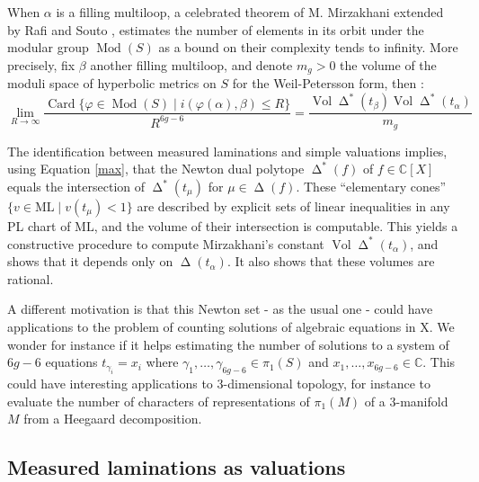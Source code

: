 \documentclass{amsart}
\newcommand{\C}{\mathbb{C}}
\newcommand{\ML}{\mathrm{ML}}
\DeclareMathOperator{\Card}{Card}
\DeclareMathOperator{\Vol}{Vol}
\DeclareMathOperator{\Mod}{Mod}
\DeclareMathOperator{\NewSet}{\Delta}
\begin{document}
When $\alpha$ is a filling multiloop, a celebrated theorem of M. Mirzakhani \cite{Mirzakhani_MCGorbits_2016} extended by Rafi and Souto \cite{Rafi-Souto_counting-problems_2017}, estimates the number of elements in its orbit under the modular group $\Mod(S)$ as a bound on their complexity tends to infinity.
%
More precisely, fix $\beta$ another filling multiloop, and denote $m_g>0$ the volume of the moduli space of hyperbolic metrics on $S$ for the Weil-Petersson form, then :
\[
\lim_{R\to \infty} \frac{\Card\{ \varphi\in \Mod(S) \mid i(\varphi(\alpha), \beta)\le R\}}{R^{6g-6}}=
\frac{\Vol \NewSet^*(t_\beta) \Vol \NewSet^*(t_\alpha)}{m_g}
\]


The identification between measured laminations and simple valuations implies, using Equation \eqref{max}, that the Newton dual polytope $\NewSet^*(f)$ of $f\in \C[X]$ equals the intersection of $\NewSet^*(t_\mu)$ for $\mu \in \NewSet(f)$. These ``elementary cones'' $\{v\in \ML \mid v(t_\mu) <1\}$ are described by explicit sets of linear inequalities in any PL chart of $\ML$, and the volume of their intersection is computable.
This yields a constructive procedure to compute Mirzakhani's constant $\Vol \NewSet^*(t_\alpha)$, and shows that it depends only on $\NewSet(t_\alpha)$. It also shows that these volumes are rational.

A different motivation is that this Newton set - as the usual one - could have applications to the problem of counting solutions of algebraic equations in X. We wonder for instance if it helps estimating the number of solutions to a system of $6g-6$ equations $t_{\gamma_i}=x_i$ where $\gamma_1,\ldots,\gamma_{6g-6}\in \pi_1(S)$ and $x_1,\ldots,x_{6g-6}\in \C$. 
This could have interesting applications to $3$-dimensional topology, for instance to evaluate the number of characters of representations of $\pi_1(M)$ of a $3$-manifold $M$ from a Heegaard decomposition.

\subsection*{Measured laminations as valuations}
\end{document}
